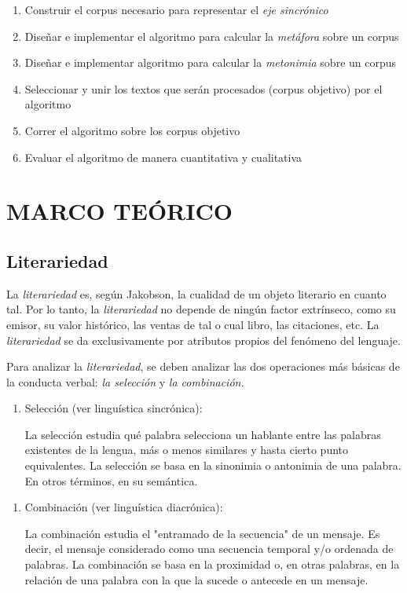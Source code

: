 \documentclass[twoside]{article}
\begin{document}
\begin{enumerate}
\item Construir el corpus necesario para representar el \emph{eje sincrónico}
\item Diseñar e implementar el algoritmo para calcular la \emph{metáfora} sobre un corpus
\item Diseñar e implementar algoritmo para calcular la \emph{metonimia} sobre un corpus
\item Seleccionar y unir los textos que serán procesados (corpus objetivo) por el algoritmo
\item Correr el algoritmo sobre los corpus objetivo
\item Evaluar el algoritmo de manera cuantitativa y cualitativa
\end{enumerate}

\section{MARCO TEÓRICO}
\label{sec:org3679f3f}

\subsection{Literariedad}
\label{sec:orgd35fdfe}


La \emph{literariedad} es, según Jakobson, la cualidad de un objeto
literario en cuanto tal. Por lo tanto, la \emph{literariedad} no depende de
ningún factor extrínseco, como su emisor, su valor histórico, las
ventas de tal o cual libro, las citaciones, etc. La \emph{literariedad} se
da exclusivamente por atributos propios del fenómeno del lenguaje.

Para analizar la \emph{literariedad}, se deben analizar las dos operaciones
más básicas de la conducta verbal: \emph{la selección} y \emph{la combinación.}


\begin{enumerate}
\item Selección (ver linguística sincrónica):

La selección estudia qué palabra selecciona un hablante entre las
palabras existentes de la lengua, más o menos similares y hasta
cierto punto equivalentes. La selección se basa en la sinonimia o
antonimia de una palabra. En otros términos, en su semántica.
\end{enumerate}



\begin{enumerate}
\item Combinación (ver linguística diacrónica):

La combinación estudia el "entramado de la secuencia" de un
mensaje. Es decir, el mensaje considerado como una secuencia
temporal y/o ordenada de palabras. La combinación se basa en la
proximidad o, en otras palabras, en la relación de una palabra con
la que la sucede o antecede en un mensaje.
\end{enumerate}
\end{document}
